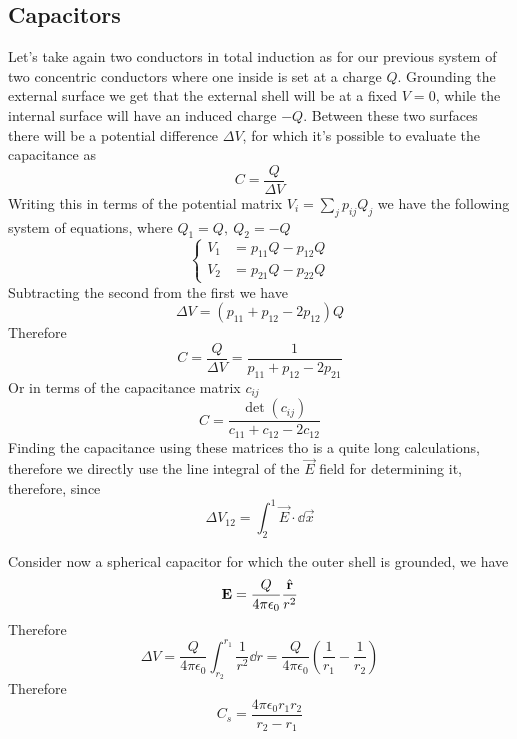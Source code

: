 \documentclass[../electromagnetism]{subfiles}
\begin{document}
\subsection{Capacitors}
Let's take again two conductors in total induction as for our previous system of two concentric conductors where one inside is set at a charge $Q$. Grounding the external surface we get that the external shell will be at a fixed $V=0$, while the internal surface will have an induced charge $-Q$. Between these two surfaces there will be a potential difference $\Delta V$, for which it's possible to evaluate the capacitance as
\begin{equation*}
	C=\frac{Q}{\Delta V}
\end{equation*}
Writing this in terms of the potential matrix $V_i=\sum_jp_{ij}Q_j$ we have the following system of equations, where $Q_1=Q,\ Q_2=-Q$
\begin{equation*}
	\left\{ \begin{aligned}
			V_1&=p_{11}Q-p_{12}Q\\
			V_2&=p_{21}Q-p_{22}Q
	\end{aligned}\right.
\end{equation*}
Subtracting the second from the first we have
\begin{equation*}
	\Delta V=\left( p_{11}+p_{12}-2p_{12} \right)Q
\end{equation*}
Therefore
\begin{equation}
	C=\frac{Q}{\Delta V}=\frac{1}{p_{11}+p_{12}-2p_{21}}
	\label{eq:capacitypotentialmatrix}
\end{equation}
Or in terms of the capacitance matrix $c_{ij}$
\begin{equation}
	C=\frac{\det(c_{ij})}{c_{11}+c_{12}-2c_{12}}
	\label{eq:capacitancecapmatrix}
\end{equation}
Finding the capacitance using these matrices tho is a quite long calculations, therefore we directly use the line integral of the $\vec{E}$ field for determining it, therefore, since
\begin{equation*}
	\Delta V_{12}=\int_{2}^{1}\vec{E}\cdot\dd\vec{x}
\end{equation*}
\begin{eg}
	Consider now a spherical capacitor for which the outer shell is grounded, we have
	\begin{equation*}
		\mathbf{E}=\frac{Q}{4\pi\epsilon_0}\frac{\hat{\mathbf{r}}}{r^2}
	\end{equation*}
	Therefore
	\begin{equation*}
		\Delta V=\frac{Q}{4\pi\epsilon_0}\int_{r_2}^{r_1}\frac{1}{r^2}\dd r=\frac{Q}{4\pi\epsilon_0}\left( \frac{1}{r_1}-\frac{1}{r_2} \right)
	\end{equation*}
	Therefore
	\begin{equation}
		C_s=\frac{4\pi\epsilon_0r_1r_2}{r_2-r_1}
		\label{eq:sphcap}
	\end{equation}
\end{eg}
\end{document}

